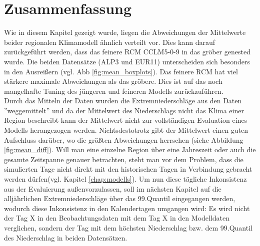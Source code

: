 \section{Zusammenfassung}\label{sec:zusammenfassung_01}
Wie in diesem Kapitel gezeigt wurde, liegen die Abweichungen der Mittelwerte beider regionalen Klimamodell ähnlich verteilt vor. Dies kann darauf zurückgeführt werden, dass das feinere RCM CCLM5-0-9 in das gröber genested wurde. Die beiden Datensätze (ALP3 und EUR11) unterscheiden sich besonders in den Ausreißern (vgl. Abb \ref{fig:mean_boxplots}). Das feinere RCM hat viel stärkere maximale Abweichungen als das gröbere. Dies ist auf das noch mangelhafte Tuning des jüngeren und feineren Modells zurückzuführen.\\
Durch das Mitteln der Daten wurden die Extremniederschläge aus den Daten ''weggemittelt'' und da der Mittelwert des Niederschlags nicht das Klima einer Region beschreibt kann der Mittelwert nicht zur vollständigen Evaluation eines Modells herangezogen werden. Nichtsdestotrotz gibt der Mittelwert einen guten Aufschluss darüber, wo die größten Abweichungen herrschen (siehe Abbildung \ref{fig:mean_diff}). Will man eine einzelne Region über eine Jahreszeit oder auch die gesamte Zeitspanne genauer betrachten, steht man vor dem Problem, dass die simulierten Tage nicht direkt mit den historischen Tagen in Verbindung gebracht werden dürfen(vgl. Kapitel \ref{chap:modells}). Um nun diese tägliche Inkonsistenz aus der Evaluierung außenvorzulassen, soll im nächsten Kapitel auf die alljährlichen Extremniederschläge über das 99.Quantil eingegangen werden, wodurch diese Inkonsistenz in den Kalendertagen umgangen wird: Es wird nicht der Tag X in den Beobachtungsdaten mit dem Tag X in den Modelldaten verglichen, sondern der Tag mit dem höchsten Niederschlag bzw. dem 99.Quantil des Niederschlag in beiden Datensätzen.

